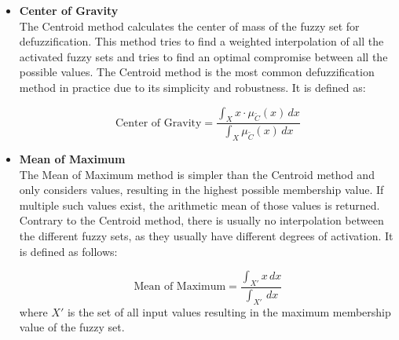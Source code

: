 \begin{itemize}
      \item \textbf{Center of Gravity} \\
            The Centroid method calculates the center of mass of the fuzzy set for defuzzification. This method tries to find a weighted interpolation of all the activated fuzzy sets and tries to find an optimal compromise between all the possible values. The Centroid method is the most common defuzzification method in practice due to its simplicity and robustness. It is defined as:

            \begin{equation}
                  \text{Center of Gravity} = \frac{\int_X x \cdot \mu_{\tilde{C}}(x) \, dx}{\int_X \mu_{\tilde{C}}(x) \, dx}
            \end{equation}

      \item \textbf{Mean of Maximum} \\
            The Mean of Maximum method is simpler than the Centroid method and only considers values, resulting in the highest possible membership value. If multiple such values exist, the arithmetic mean of those values is returned. Contrary to the Centroid method, there is usually no interpolation between the different fuzzy sets, as they usually have different degrees of activation. It is defined as follows:

            \begin{equation}
                  \text{Mean of Maximum} = \frac{\int_{X'} x \, dx}{\int_{X'}  \, dx}
            \end{equation}
            where $X'$ is the set of all input values resulting in the maximum membership value of the fuzzy set.
\end{itemize}


